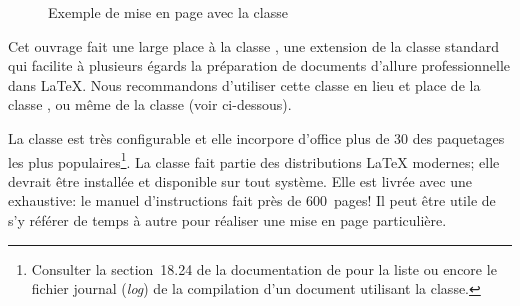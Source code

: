 \begin{figure}
\begin{minipage}{0.49\linewidth}
  \end{minipage}
  \caption{Exemple de mise en page avec la classe }
  \label{fig:organisation:classes:book}
\end{figure}

Cet ouvrage fait une large place à la classe 
\citep{memoir}, une extension de la classe standard  qui
facilite à plusieurs égards la préparation de documents d'allure
professionnelle dans {\LaTeX}. Nous recommandons d'utiliser cette
classe en lieu et place de la classe , ou même de la
classe  (voir ci-dessous).

La classe  est très configurable et elle incorpore
d'office plus de 30 des paquetages les plus populaires\footnote{%
  Consulter la section~18.24 de la documentation de 
  pour la liste ou encore le fichier journal (\emph{log}) de la
  compilation d'un document utilisant la classe.}. %
La classe fait partie des distributions {\LaTeX} modernes; elle
devrait être installée et disponible sur tout système. Elle est
livrée avec une %
exhaustive: le manuel d'instructions fait près de 600~pages! Il peut
être utile de s'y référer de temps à autre pour réaliser une mise en
page particulière.


